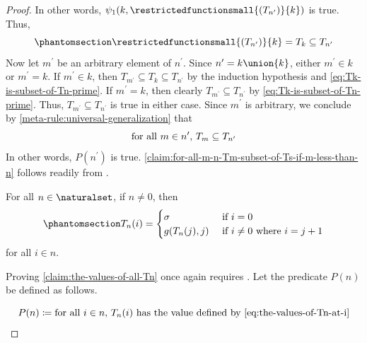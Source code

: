 \begin{proof}
    In other words, \( \psi_{1}(k, \restrictedfunctionsmall{(T_{n^{\prime}})}{k}) \) is true.
    Thus,
    \begin{equation}
        \phantomsection \label{eq:Tk-is-subset-of-Tn-prime}
        \restrictedfunctionsmall{(T_{n^{\prime}})}{k} = T_{k} \subseteq T_{n^{\prime}}
    \end{equation}
    Now let \( m^{\prime} \) be an arbitrary element of \( n^{\prime} \).
    Since \( n^{\prime} = k \union \mleft\{ k \mright\} \), either \( m^{\prime} \in k \) or \( m^{\prime} = k \).
    If \( m^{\prime} \in k \), then \( T_{m^{\prime}} \subseteq T_{k} \subseteq T_{n^{\prime}} \) by the induction hypothesis
    and \eqref{eq:Tk-is-subset-of-Tn-prime}.
    If \( m^{\prime} = k \), then clearly \( T_{m^{\prime}} \subseteq T_{n^{\prime}} \) by \eqref{eq:Tk-is-subset-of-Tn-prime}.
    Thus, \( T_{m^{\prime}} \subseteq T_{n^{\prime}} \) is true in either case.
    Since \( m^{\prime} \) is arbitrary, we conclude by \cref{meta-rule:universal-generalization} that
    \begin{equation*}
        \text{for all \( m \in n^{\prime} \), \( T_{m} \subseteq T_{n^{\prime}} \)}
    \end{equation*}
    In other words, \( P(n^{\prime}) \) is true.
    \cref{claim:for-all-m-n-Tm-subset-of-Ts-if-m-less-than-n} follows readily from .

    \begin{claim}
         \label{claim:the-values-of-all-Tn}
        For all \( n \in \naturalset \), if \( n \neq 0 \), then
        \begin{equation}
            \phantomsection \label{eq:the-values-of-Tn-at-i}
            T_{n}(i) =
            \begin{cases}
                \sigma \ &\text{if} \ i = 0 \\
                g(T_{n}(j), j) \ &\text{if} \ i \neq 0 \ \text{where} \ i = j + 1
            \end{cases}
        \end{equation}
        for all \( i \in n \).
    \end{claim}
    \noindent
    Proving \cref{claim:the-values-of-all-Tn} once again requires .
    Let the predicate \( P(n) \) be defined as follows.

    \begin{equation*}
        P(n) \coloneq \text{for all \( i \in n \), \( T_{n}(i) \) has the value defined by \eqref{eq:the-values-of-Tn-at-i}}
    \end{equation*}
    

\end{proof}

